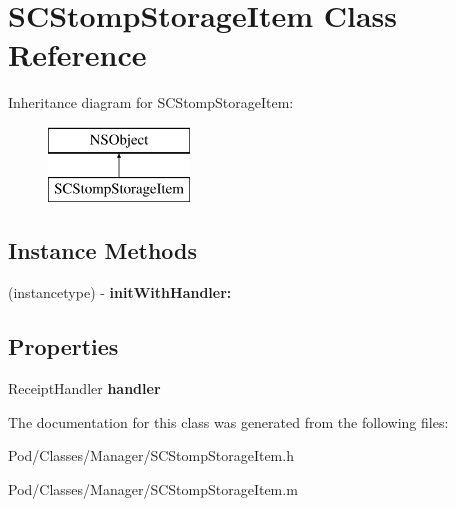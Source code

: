 \hypertarget{interface_s_c_stomp_storage_item}{}\section{S\+C\+Stomp\+Storage\+Item Class Reference}
\label{interface_s_c_stomp_storage_item}
Inheritance diagram for S\+C\+Stomp\+Storage\+Item\+:\begin{figure}[H]
\begin{center}
\leavevmode
\includegraphics[height=2.000000cm]{interface_s_c_stomp_storage_item}
\end{center}
\end{figure}
\subsection*{Instance Methods}
\begin{DoxyCompactItemize}
\item 
(instancetype) -\/ {\bfseries init\+With\+Handler\+:}\hypertarget{interface_s_c_stomp_storage_item_a718e2981b9c6053df3c0705fe5bdb442}{}\label{interface_s_c_stomp_storage_item_a718e2981b9c6053df3c0705fe5bdb442}

\end{DoxyCompactItemize}
\subsection*{Properties}
\begin{DoxyCompactItemize}
\item 
Receipt\+Handler {\bfseries handler}\hypertarget{interface_s_c_stomp_storage_item_a3434eecbf9cfc4b48828be0afe85e58a}{}\label{interface_s_c_stomp_storage_item_a3434eecbf9cfc4b48828be0afe85e58a}

\end{DoxyCompactItemize}


The documentation for this class was generated from the following files\+:\begin{DoxyCompactItemize}
\item 
Pod/\+Classes/\+Manager/S\+C\+Stomp\+Storage\+Item.\+h\item 
Pod/\+Classes/\+Manager/S\+C\+Stomp\+Storage\+Item.\+m\end{DoxyCompactItemize}
